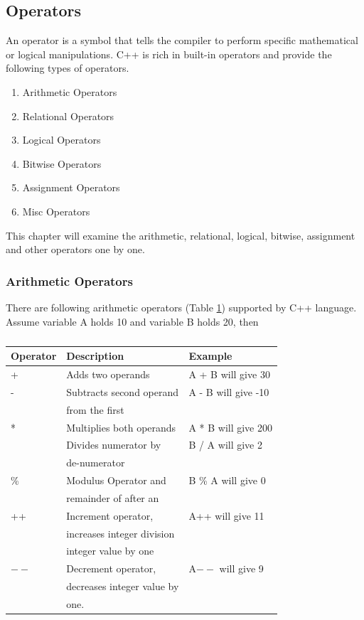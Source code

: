 \documentclass{book}
\begin{document}
\subsection{Operators}

An operator is a symbol that tells the compiler to perform specific mathematical or logical manipulations. C++ is rich in built-in operators and provide the following types of operators. 

\begin{enumerate}
	\item Arithmetic Operators
\item Relational Operators
\item Logical Operators
\item Bitwise Operators
\item Assignment Operators
\item Misc Operators
\end{enumerate}

This chapter will examine the arithmetic, relational, logical, bitwise, assignment and other operators one by one.

\subsubsection{Arithmetic Operators}

There are following arithmetic operators (Table \ref{arithop}) supported by C++ language. Assume variable A holds 10 and variable B holds 20, then

\begin{table}[h]
\tiny
\centering 
\begin{tabular}{lll} \hline 
Operator	& Description	& Example \\ \hline 
+	& Adds two operands	& A + B will give 30 \\
-	& Subtracts second operand  	& A - B will give -10 \\
& from the first & \\
*	& Multiplies both operands	& A * B will give 200 \\
\/	& Divides numerator by & B / A will give 2 \\
& de-numerator	 & \\
\%	& Modulus Operator and  & B \% A will give 0 \\
& remainder of after an 	 & \\
++	& Increment operator,  	& A++ will give 11 \\
& increases integer division & \\
& integer value by one & \\
$--$	& Decrement operator,  	& A$--$ will give 9 \\ 
& decreases integer value by  & \\ 
& one. & \\ \hline 
\end{tabular}
\caption{}
\label{arithop}
\end{table}
\end{document}
